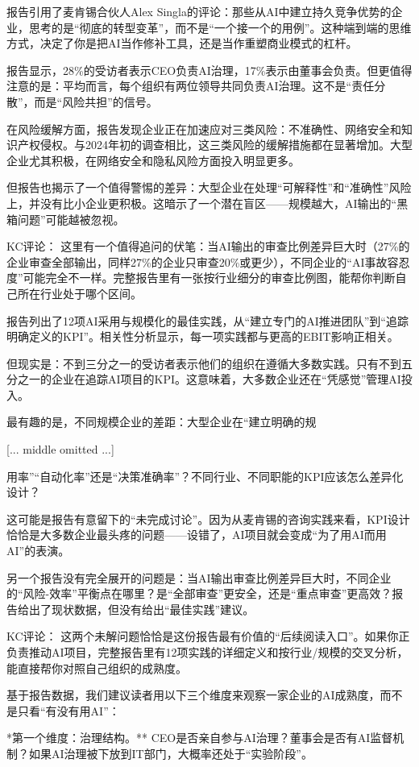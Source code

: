 \documentclass[11pt]{ctexart}
\begin{document}
报告引用了麦肯锡合伙人Alex Singla的评论：那些从AI中建立持久竞争优势的企业，思考的是“彻底的转型变革”，而不是“一个接一个的用例”。这种端到端的思维方式，决定了你是把AI当作修补工具，还是当作重塑商业模式的杠杆。

报告显示，28\%的受访者表示CEO负责AI治理，17\%表示由董事会负责。但更值得注意的是：平均而言，每个组织有两位领导共同负责AI治理。这不是“责任分散”，而是“风险共担”的信号。

在风险缓解方面，报告发现企业正在加速应对三类风险：不准确性、网络安全和知识产权侵权。与2024年初的调查相比，这三类风险的缓解措施都在显著增加。大型企业尤其积极，在网络安全和隐私风险方面投入明显更多。

但报告也揭示了一个值得警惕的差异：大型企业在处理“可解释性”和“准确性”风险上，并没有比小企业更积极。这暗示了一个潜在盲区——规模越大，AI输出的“黑箱问题”可能越被忽视。

KC评论： 这里有一个值得追问的伏笔：当AI输出的审查比例差异巨大时（27\%的企业审查全部输出，同样27\%的企业只审查20\%或更少），不同企业的“AI事故容忍度”可能完全不一样。完整报告里有一张按行业细分的审查比例图，能帮你判断自己所在行业处于哪个区间。

报告列出了12项AI采用与规模化的最佳实践，从“建立专门的AI推进团队”到“追踪明确定义的KPI”。相关性分析显示，每一项实践都与更高的EBIT影响正相关。

但现实是：不到三分之一的受访者表示他们的组织在遵循大多数实践。只有不到五分之一的企业在追踪AI项目的KPI。这意味着，大多数企业还在“凭感觉”管理AI投入。

最有趣的是，不同规模企业的差距：大型企业在“建立明确的规

[... middle omitted ...]

用率”“自动化率”还是“决策准确率”？不同行业、不同职能的KPI应该怎么差异化设计？

这可能是报告有意留下的“未完成讨论”。因为从麦肯锡的咨询实践来看，KPI设计恰恰是大多数企业最头疼的问题——设错了，AI项目就会变成“为了用AI而用AI”的表演。

另一个报告没有完全展开的问题是：当AI输出审查比例差异巨大时，不同企业的“风险-效率”平衡点在哪里？是“全部审查”更安全，还是“重点审查”更高效？报告给出了现状数据，但没有给出“最佳实践”建议。

KC评论： 这两个未解问题恰恰是这份报告最有价值的“后续阅读入口”。如果你正负责推动AI项目，完整报告里有12项实践的详细定义和按行业/规模的交叉分析，能直接帮你对照自己组织的成熟度。

基于报告数据，我们建议读者用以下三个维度来观察一家企业的AI成熟度，而不是只看“有没有用AI”：

*第一个维度：治理结构。** CEO是否亲自参与AI治理？董事会是否有AI监督机制？如果AI治理被下放到IT部门，大概率还处于“实验阶段”。
\end{document}
